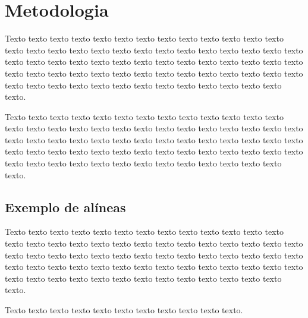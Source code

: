 \chapter{Metodologia}
\label{chap:metodologia}

Texto texto texto texto texto texto texto texto texto texto texto texto texto texto texto texto texto texto texto texto texto texto texto texto texto texto texto texto texto texto texto texto texto texto texto texto texto texto texto texto texto texto texto texto texto texto texto texto texto texto texto texto texto texto texto texto texto texto texto texto texto texto texto texto texto texto texto texto texto.

Texto texto texto texto texto texto texto texto texto texto texto texto texto texto texto texto texto texto texto texto texto texto texto texto texto texto texto texto texto texto texto texto texto texto texto texto texto texto texto texto texto texto texto texto texto texto texto texto texto texto texto texto texto texto texto texto texto texto texto texto texto texto texto texto texto texto texto texto texto.

\section{Exemplo de alíneas}\label{sec:exemplo-de-algoritmos-e-figuras}

    Texto texto texto texto texto texto texto texto texto texto texto texto texto texto texto texto texto texto texto texto texto texto texto texto texto texto texto texto texto texto texto texto texto texto texto texto texto texto texto texto texto texto texto texto texto texto texto texto texto texto texto texto texto texto texto texto texto texto texto texto texto texto texto texto texto texto texto texto texto.


    Texto texto texto texto texto texto texto texto texto texto texto.

